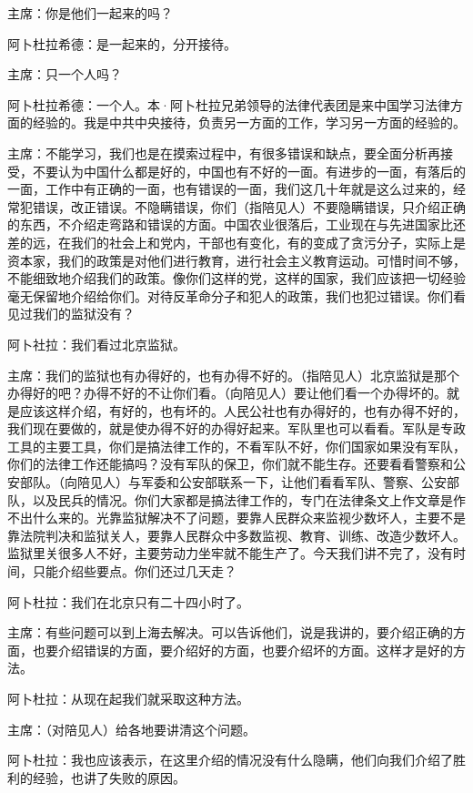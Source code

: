 主席：你是他们一起来的吗？

阿卜杜拉希德：是一起来的，分开接待。

主席：只一个人吗？

阿卜杜拉希德：一个人。本·阿卜杜拉兄弟领导的法律代表团是来中国学习法律方面的经验的。我是中共中央接待，负责另一方面的工作，学习另一方面的经验的。

主席：不能学习，我们也是在摸索过程中，有很多错误和缺点，要全面分析再接受，不要认为中国什么都是好的，中国也有不好的一面。有进步的一面，有落后的一面，工作中有正确的一面，也有错误的一面，我们这几十年就是这么过来的，经常犯错误，改正错误。不隐瞒错误，你们（指陪见人）不要隐瞒错误，只介绍正确的东西，不介绍走弯路和错误的方面。中国农业很落后，工业现在与先进国家比还差的远，在我们的社会上和党内，干部也有变化，有的变成了贪污分子，实际上是资本家，我们的政策是对他们进行教育，进行社会主义教育运动。可惜时间不够，不能细致地介绍我们的政策。像你们这样的党，这样的国家，我们应该把一切经验毫无保留地介绍给你们。对待反革命分子和犯人的政策，我们也犯过错误。你们看见过我们的监狱没有？

阿卜社拉：我们看过北京监狱。

主席：我们的监狱也有办得好的，也有办得不好的。（指陪见人）北京监狱是那个办得好的吧？办得不好的不让你们看。（向陪见人）要让他们看一个办得坏的。就是应该这样介绍，有好的，也有坏的。人民公社也有办得好的，也有办得不好的，我们现在要做的，就是使办得不好的办得好起来。军队里也可以看看。军队是专政工具的主要工具，你们是搞法律工作的，不看军队不好，你们国家如果没有军队，你们的法律工作还能搞吗？没有军队的保卫，你们就不能生存。还要看看警察和公安部队。（向陪见人）与军委和公安部联系一下，让他们看看军队、警察、公安部队，以及民兵的情况。你们大家都是搞法律工作的，专门在法律条文上作文章是作不出什么来的。光靠监狱解决不了问题，要靠人民群众来监视少数坏人，主要不是靠法院判决和监狱关人，要靠人民群众中多数监视、教育、训练、改造少数坏人。监狱里关很多人不好，主要劳动力坐牢就不能生产了。今天我们讲不完了，没有时间，只能介绍些要点。你们还过几天走？

阿卜杜拉：我们在北京只有二十四小时了。

主席：有些问题可以到上海去解决。可以告诉他们，说是我讲的，要介绍正确的方面，也要介绍错误的方面，要介绍好的方面，也要介绍坏的方面。这样才是好的方法。

阿卜杜拉：从现在起我们就采取这种方法。

主席：（对陪见人）给各地要讲清这个问题。

阿卜杜拉：我也应该表示，在这里介绍的情况没有什么隐瞒，他们向我们介绍了胜利的经验，也讲了失败的原因。

